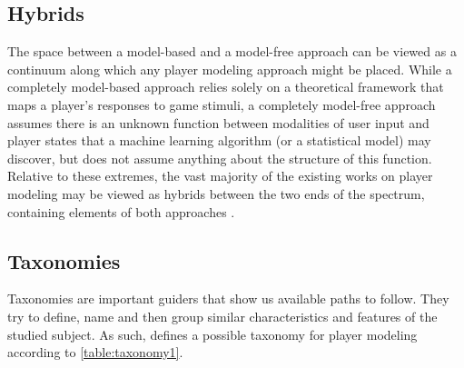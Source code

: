 \subsection{Hybrids}
The space between a model-based and a model-free approach can be viewed as a continuum along which any player modeling approach might be placed. While a completely model-based approach relies solely on a theoretical framework that maps a player’s responses to game stimuli, a completely model-free approach assumes there is an unknown function between modalities of user input and player states that a machine learning algorithm (or a statistical model) may discover, but does not assume anything about the structure of this function. Relative to these extremes, the vast majority of the existing works on player modeling may be viewed as hybrids between the two ends of the spectrum, containing elements of both approaches \citep{YannakakisPlayerModeling2013}.

\subsection{Taxonomies}
Taxonomies are important guiders that show us available paths to follow. They try to define, name and then group similar characteristics and features of the studied subject. As such, \citep{MachadoPlayermodelingcommon2011} defines a possible taxonomy for player modeling according to \ref{table:taxonomy1}.

\begin{table}[ht]
	\centering
	\caption{Player Modeling Taxonomy Summary by \citep{MachadoPlayermodelingcommon2011}}
	\label{table:taxonomy1}
\end{table}


